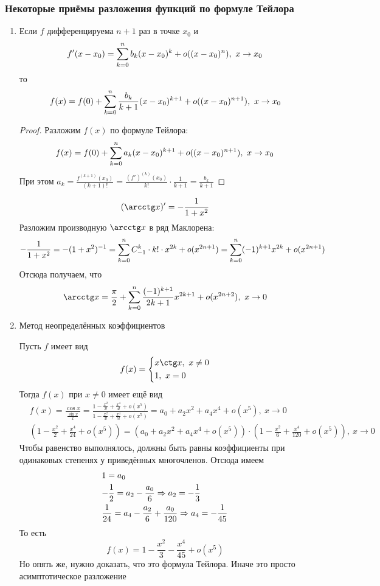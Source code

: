\subsubsection*{Некоторые приёмы разложения функций по формуле Тейлора}

\begin{enumerate}
	\item Если $f$ дифференцируема $n + 1$ раз в точке $x_0$ и 
	\[
	f'(x - x_0) = \sum\limits_{k = 0}^n b_k (x - x_0)^k + o((x - x_0)^n),\ x \to x_0
	\]
	то
	\[
		f(x) = f(0) + \sum\limits_{k = 0}^n \frac{b_k}{k + 1} (x - x_0)^{k + 1} + o((x - x_0)^{n + 1}),\ x \to x_0
	\]
	\begin{proof}
		Разложим $f(x)$ по формуле Тейлора:
		\[
		f(x) = f(0) + \sum\limits_{k = 0}^n a_k (x - x_0)^{k + 1} + o((x - x_0)^{n + 1}),\ x \to x_0
		\]
		При этом $a_k = \frac{f^{(k + 1)}(x_0)}{(k + 1)!} = \frac{(f')^{(k)}(x_0)}{k!} \cdot \frac{1}{k + 1} = \frac{b_k}{k + 1}$
	\end{proof}
	\begin{example}
		\[
			(\arcctg x)' = -\frac{1}{1 + x^2}
		\]
		Разложим производную $\arcctg x$ в ряд Маклорена:
		\[
			-\frac{1}{1 + x^2} = -(1 + x^2)^{-1} = \sum\limits_{k = 0}^n C_{-1}^k \cdot k! \cdot x^{2k} + o(x^{2n + 1}) = \sum\limits_{k = 0}^n (-1)^{k + 1} x^{2k} + o(x^{2n + 1})
		\]
		Отсюда получаем, что
		\[
			\arcctg x = \frac{\pi}{2} + \suml_{k = 0}^n \frac{(-1)^{k + 1}}{2k + 1} x^{2k + 1} + o(x^{2n + 2}),\ x \to 0
		\]
	\end{example}

	\item Метод неопределённых коэффициентов
	\begin{example}
		Пусть $f$ имеет вид
		\[
			f(x) = \System{
				&{x \ctg x,\ x \neq 0}
				\\
				&{1,\ x = 0}
			}
		\]
		Тогда $f(x)$ при $x \neq 0$ имеет ещё вид
		\begin{align*}
			&f(x) = \frac{\cos x}{\frac{\sin x}{x}} = \frac{1 - \frac{x^2}{2!} + \frac{x^4}{4!} + o(x^5)}{1 - \frac{x^2}{3!} + \frac{x^4}{5!} + o(x^5)} = a_0 + a_2x^2 + a_4x^4 + o(x^5),\ x \to 0
			\\
			&\left(1 - \frac{x^2}{2} + \frac{x^4}{24} + o(x^5)\right) = \left(a_0 + a_2x^2 + a_4x^4 + o(x^5)\right) \cdot \left(1 - \frac{x^2}{6} + \frac{x^4}{120} + o(x^5)\right),\ x \to 0
		\end{align*}
		Чтобы равенство выполнялось, должны быть равны коэффициенты при одинаковых степенях у приведённых многочленов. Отсюда имеем
		\begin{align*}
			&{1 = a_0}
			\\
			&{-\frac{1}{2} = a_2 - \frac{a_0}{6} \Rightarrow a_2 = -\frac{1}{3}}
			\\
			&{\frac{1}{24} = a_4 - \frac{a_2}{6} + \frac{a_0}{120} \Rightarrow a_4 = -\frac{1}{45}}
		\end{align*}
		То есть
		\[
			f(x) = 1 - \frac{x^2}{3} - \frac{x^4}{45} + o(x^5)
		\]
		Но опять же, нужно доказать, что это формула Тейлора. Иначе это просто асимптотическое разложение
	\end{example}


\end{enumerate}
